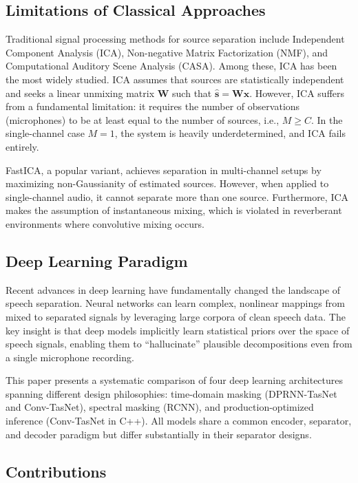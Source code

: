 \documentclass[conference]{IEEEtran}
\begin{document}
\subsection{Limitations of Classical Approaches}

Traditional signal processing methods for source separation include Independent Component Analysis (ICA), Non-negative Matrix Factorization (NMF), and Computational Auditory Scene Analysis (CASA). Among these, ICA has been the most widely studied. ICA assumes that sources are statistically independent and seeks a linear unmixing matrix $\mathbf{W}$ such that $\hat{\mathbf{s}} = \mathbf{W}\mathbf{x}$. However, ICA suffers from a fundamental limitation: it requires the number of observations (microphones) to be at least equal to the number of sources, i.e., $M \geq C$. In the single-channel case $M=1$, the system is heavily underdetermined, and ICA fails entirely.

FastICA, a popular variant, achieves separation in multi-channel setups by maximizing non-Gaussianity of estimated sources. However, when applied to single-channel audio, it cannot separate more than one source. Furthermore, ICA makes the assumption of instantaneous mixing, which is violated in reverberant environments where convolutive mixing occurs.

\subsection{Deep Learning Paradigm}

Recent advances in deep learning have fundamentally changed the landscape of speech separation. Neural networks can learn complex, nonlinear mappings from mixed to separated signals by leveraging large corpora of clean speech data. The key insight is that deep models implicitly learn statistical priors over the space of speech signals, enabling them to ``hallucinate'' plausible decompositions even from a single microphone recording.

This paper presents a systematic comparison of four deep learning architectures spanning different design philosophies: time-domain masking (DPRNN-TasNet and Conv-TasNet), spectral masking (RCNN), and production-optimized inference (Conv-TasNet in C++). All models share a common encoder, separator, and decoder paradigm but differ substantially in their separator designs.

\subsection{Contributions}
\end{document}
